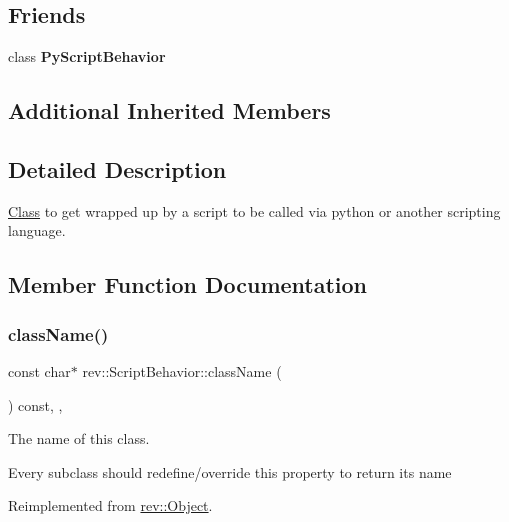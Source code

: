 \subsection*{Friends}
\begin{DoxyCompactItemize}
\item 
\mbox{\label{classrev_1_1_script_behavior_aa451d008cb7b5d795d86513286b48d03}} 
class {\bfseries Py\+Script\+Behavior}
\end{DoxyCompactItemize}
\subsection*{Additional Inherited Members}


\subsection{Detailed Description}
\mbox{\hyperlink{struct_class}{Class}} to get wrapped up by a script to be called via python or another scripting language. 

\subsection{Member Function Documentation}
\mbox{\label{classrev_1_1_script_behavior_abb2e3df30c7fdb8ad6b81459b14c4906}} 
\subsubsection{\texorpdfstring{className()}{className()}}
{\footnotesize\ttfamily const char$\ast$ rev\+::\+Script\+Behavior\+::class\+Name (\begin{DoxyParamCaption}{ }\end{DoxyParamCaption}) const\hspace{0.3cm}{\ttfamily [inline]}, {\ttfamily [override]}, {\ttfamily [virtual]}}



The name of this class. 

Every subclass should redefine/override this property to return its name 

Reimplemented from \mbox{\hyperlink{classrev_1_1_object_a7a2013f91169479b65cf93afdc5d9a68}{rev\+::\+Object}}.

